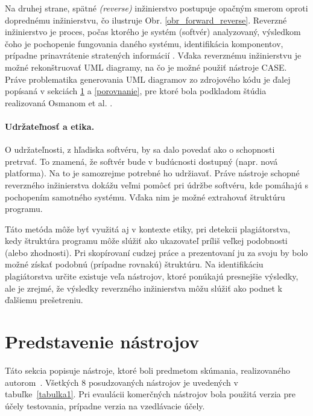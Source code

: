 \documentclass[10pt,twoside,slovak,a4paper]{article}
\begin{document}
Na druhej strane, spätné \textit{(reverse)} inžinierstvo postupuje opačným smerom oproti doprednému inžinierstvu, čo ilustruje Obr.  \ref{obr_forward_reverse}. 
Reverzné inžinierstvo je proces, počas ktorého je systém (softvér) analyzovaný, výsledkom čoho je pochopenie fungovania daného systému, identifikácia komponentov, prípadne prinavrátenie stratených informácií \cite{2010}.
Vďaka reverznému inžinierstvu je možné rekonštruovať UML diagramy, na čo je možné použiť nástroje CASE. Práve problematika generovania UML diagramov zo zdrojového kódu je ďalej popísaná v sekciách \ref{predstavenie} a \ref{porovnanie}, pre ktoré bola podkladom štúdia
realizovaná Osmanom et al. \cite{Osman:RE}. 

\paragraph{Udržateľnosť a etika.}
O udržateľnosti, z hľadiska softvéru, by sa dalo povedať ako o schopnosti pretrvať. To znamená, že softvér bude v budúcnosti dostupný (napr. nová platforma). Na to je samozrejme potrebné ho udržiavať. Práve nástroje schopné reverzného inžinierstva dokážu veľmi pomôcť pri údržbe softvéru, kde pomáhajú s pochopením samotného systému. Vďaka nim je možné extrahovať štruktúru programu. 

Táto metóda môže byť využitá aj v kontexte etiky, pri detekcii plagiátorstva, kedy štruktúra programu môže slúžiť ako ukazovateľ príliš veľkej podobnosti (alebo zhodnosti). Pri skopírovaní cudzej práce a prezentovaní ju za svoju by bolo možné získať podobnú (prípadne rovnakú) štruktúru. Na identifikáciu plagiátorstva určite existuje veľa nástrojov, ktoré ponúkajú presnejšie výsledky, ale je zrejmé, že výsledky reverzného inžinierstva môžu slúžiť ako podnet k ďalšiemu prešetreniu.


\section{Predstavenie nástrojov}\label{predstavenie}

Táto sekcia popisuje nástroje, ktoré boli predmetom skúmania, realizovaného autorom~\cite{Osman:RE}. Všetkých 8 posudzovaných nástrojov je uvedených v tabuľke~\ref{tabulka1}. Pri evaulácii komerčných nástrojov bola použitá verzia pre účely testovania, prípadne verzia na vzedlávacie účely.
\end{document}
